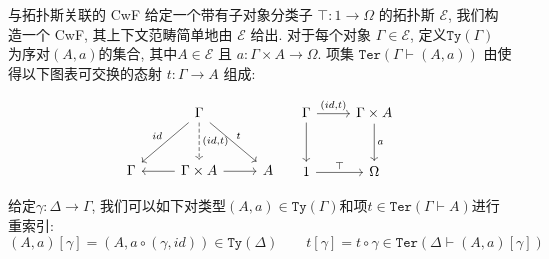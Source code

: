\documentclass[aspectratio=169,xcolor=dvipsnames]{beamer}
\newcommand\calE{\mathcal{E}}
\newcommand\Ty{\mathtt{Ty}}
\newcommand\Ter{\mathtt{Ter}}
\begin{document}
\begin{frame}{与拓扑斯关联的 CwF}
  给定一个带有子对象分类子 $\top : 1 \to Ω$ 的拓扑斯 $\calE$, 我们构造一个 CwF, 其上下文范畴简单地由 $\calE$ 给出. 对于每个对象 $\Gamma\in\calE$, 定义$\Ty(\Gamma)$ 为序对$(A,a)$的集合, 其中$A\in\calE$ 且 $a:\Gamma\times A\to\Omega$. 项集 $\Ter(\Gamma\vdash(A,a))$ 由使得以下图表可交换的态射 $t:\Gamma\to A$ 组成:

\[
\begin{tabular}{cc}
        \begin{tikzcd}[row sep=large]
        & \Gamma \arrow[d,dashed,"{(id,t)}"] \arrow[ld,"id"'] \arrow[rd,"t"] & \\
        \Gamma & \Gamma\times A \arrow[l] \arrow[r] & A
      \end{tikzcd}
      &
        \begin{tikzcd}[row sep=large]
  \Gamma \arrow[d] \arrow[r,"{(id,t)}"] & \Gamma\times A \arrow[d,"a"] \\
  1 \arrow[r,"\top"] & \Omega 
  \end{tikzcd}
\end{tabular}
\]

  给定$\gamma:\Delta\to\Gamma$, 我们可以如下对类型$(A,a)\in\Ty(\Gamma)$和项$t\in\Ter(\Gamma\vdash A)$进行重索引:
  \[
  (A,a)[\gamma]=(A,a\circ(\gamma,id))\in\Ty(\Delta)\qquad t[\gamma]=t\circ\gamma\in\Ter(\Delta\vdash(A,a)[\gamma])
  \]
\end{frame}
\end{document}
